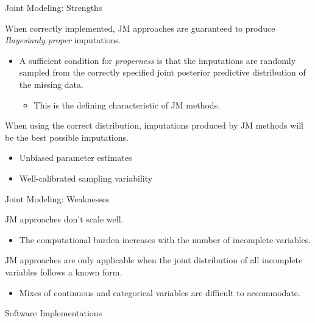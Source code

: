 \documentclass[10pt]{beamer}\usepackage[]{graphicx}\usepackage[]{color}
\begin{document}
\begin{frame}[allowframebreaks]{Joint Modeling: Strengths}
  
  When correctly implemented, JM approaches are guaranteed to produce 
  \emph{Bayesianly proper} imputations.
  \vb
  \begin{itemize}
  \item A sufficient condition for \emph{properness} is that the imputations 
    are randomly sampled from the correctly specified joint posterior predictive 
    distribution of the missing data.
    \vc
    \begin{itemize}
    \item This is the defining characteristic of JM methods.
    \end{itemize}
  \end{itemize}
  \va
  When using the correct distribution, imputations produced by JM methods will 
  be the best possible imputations.
  \begin{itemize}
  \item Unbiased parameter estimates
  \item Well-calibrated sampling variability
  \end{itemize}
  
\end{frame}


\begin{frame}{Joint Modeling: Weaknesses}
  
  JM approaches don't scale well.
  \vc
  \begin{itemize}
  \item The computational burden increases with the number of incomplete 
    variables.
  \end{itemize}
  \va
  JM approaches are only applicable when the joint distribution of all 
  incomplete variables follows a known form.
  \vc
  \begin{itemize}
  \item Mixes of continuous and categorical variables are difficult to 
    accommodate.
  \end{itemize}
  
\end{frame}


\begin{frame}{Software Implementations}
  
\end{frame}
\end{document}

